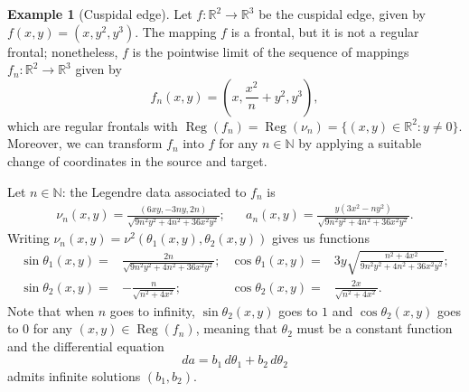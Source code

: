\documentclass{amsart}
\theoremstyle{definition}
\theoremstyle{definition}
\newtheorem{example}{Example}
\theoremstyle{definition}
\newcommand{\mb}{\mathbb}
\DeclareMathOperator{\Reg}{Reg}
\begin{document}
{\begin{example}[Cuspidal edge]
Let $f\colon \mb{R}^2 \to \mb{R}^3$ be the cuspidal edge, given by $f(x,y)=(x,y^2,y^3)$.
{The mapping $f$ is a frontal, but it is not a regular frontal; nonetheless, }$f$ is the pointwise limit of the sequence of mappings $f_n\colon \mb{R}^2 \to \mb{R}^3$ given by
	\[f_n(x,y)=\left(x,\frac{x^2}{n}+y^2,y^3\right),\]
which are regular frontals with $\Reg(f_n)=\Reg(\nu_n)=\{(x,y) \in \mb{R}^2: y\neq 0\}$.
Moreover, we can transform $f_n$ into $f$ for any $n \in \mb{N}$ by applying a suitable change of coordinates in the source and target.

Let $n \in \mb{N}$: the Legendre data associated to $f_n$ is
\begin{align*}
	\nu_n(x,y)=\frac{(6 x y,-3 n y, 2n)}{\sqrt{9 n^2 y^2+4 n^2+36 x^2 y^2}}; && a_n(x,y)=\frac{y \left(3 x^2-n y^2\right)}{\sqrt{9 n^2 y^2+4 n^2+36 x^2 y^2}}.
\end{align*}
Writing $\nu_n(x,y)=\nu^2(\theta_1(x,y),\theta_2(x,y))$ gives us functions
\begin{align*}
	\sin \theta_1(x,y)=&\frac{2 n}{\sqrt{9 n^2 y^2+4 n^2+36 x^2 y^2}}; 	&\cos \theta_1(x,y)=&3 y \sqrt{\frac{n^2+4 x^2}{9 n^2 y^2+4 n^2+36 x^2 y^2}};\\
	\sin \theta_2(x,y)=&-\frac{n}{\sqrt{n^2+4 x^2}}; 					&\cos \theta_2(x,y)=&\frac{2 x}{\sqrt{n^2+4 x^2}}.
\end{align*}
{Note that when $n$ goes to infinity, $\sin \theta_2(x,y)$ goes to $1$ and $\cos\theta_2(x,y)$ goes to $0$ for any $(x,y) \in \Reg(f_n)$, meaning that $\theta_2$ must be a constant function and the differential equation
	\[da=b_1\,d\theta_1+b_2\,d\theta_2\]
admits infinite solutions $(b_1,b_2)$.}


\end{example}}
\end{document}
